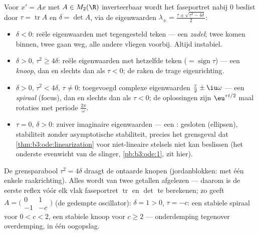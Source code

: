 \begin{example}
\label{ex:b3:ode:planeclassification}
Voor $x' = Ax$ met $A \in M_2(\R)$ inverteerbaar wordt het
faseportret nabij $0$ beslist door $\tau = \operatorname{tr}A$ en
$\delta = \det A$, via de eigenwaarden $\lambda_\pm = \frac{\tau
\pm \sqrt{\tau^2 - 4\delta}}2$:
\begin{itemize}
  \item $\delta < 0$: reële eigenwaarden met tegengesteld teken
        --- een \emph{zadel}; twee  komen binnen, twee gaan
        weg, alle andere vliegen voorbij. Altijd instabiel.
  \item $\delta > 0$, $\tau^2 \geq 4\delta$: reële eigenwaarden
        met hetzelfde teken ($= \operatorname{sign}\tau$) --- een
        \emph{knoop},  dan en slechts dan als $\tau < 0$;
        de  raken de trage eigenrichting.
  \item $\delta > 0$, $\tau^2 < 4\delta$, $\tau \neq 0$:
        toegevoegd complexe eigenwaarden $\frac\tau2 \pm
        \iu\omega$ --- een \emph{spiraal} (focus),  dan en
        slechts dan als $\tau < 0$; de oplossingen zijn
        $\eu^{\tau t/2}$ maal rotaties met periode
        $\frac{2\pi}\omega$.
  \item $\tau = 0$, $\delta > 0$: zuiver imaginaire eigenwaarden
        --- een \emph{}: gesloten  (ellipsen),
        stabiliteit zonder asymptotische stabiliteit, precies het
        grensgeval dat \cref{thm:b3:ode:linearization} voor
        niet-lineaire stelsels niet kan beslissen (het onderste
        evenwicht van de slinger, \cref{pb:b3:ode:1}, zit hier).
\end{itemize}
De grensparabool $\tau^2 = 4\delta$ draagt de ontaarde knopen
(jordanblokken:  met één enkele raakrichting). Alles wordt
van twee getallen afgelezen --- daarom is de eerste reflex vóór
elk vlak faseportret $\operatorname{tr}$ en $\det$ te berekenen;
zo geeft $A = \bigl(\begin{smallmatrix}0 & 1\\ -1 &
-c\end{smallmatrix}\bigr)$ (de gedempte oscillator): $\delta = 1
> 0$, $\tau = -c$: een stabiele spiraal voor $0 < c < 2$, een
stabiele knoop voor $c \geq 2$ --- onderdemping tegenover
overdemping, in één oogopslag.
\end{example}

